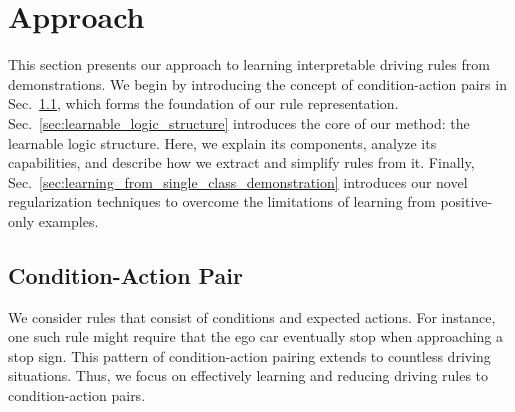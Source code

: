 \section{Approach}
\label{sec:approach}

This section presents our approach to learning interpretable driving rules from demonstrations. We begin by introducing the concept of condition-action pairs in Sec.~\ref{sec:condition-action-pair}, which forms the foundation of our rule representation. Sec.~\ref{sec:learnable_logic_structure} introduces the core of our method: the learnable logic structure. Here, we explain its components, analyze its capabilities, and describe how we extract and simplify rules from it. Finally, Sec.~\ref{sec:learning_from_single_class_demonstration} introduces our novel regularization techniques to overcome the limitations of learning from positive-only examples.

\subsection{Condition-Action Pair}
\label{sec:condition-action-pair}
We consider rules that consist of conditions and expected actions. For instance, one such rule might require that the ego car eventually stop when approaching a stop sign. This pattern of condition-action pairing extends to countless driving situations. Thus, we focus on effectively learning and reducing driving rules to condition-action pairs.

